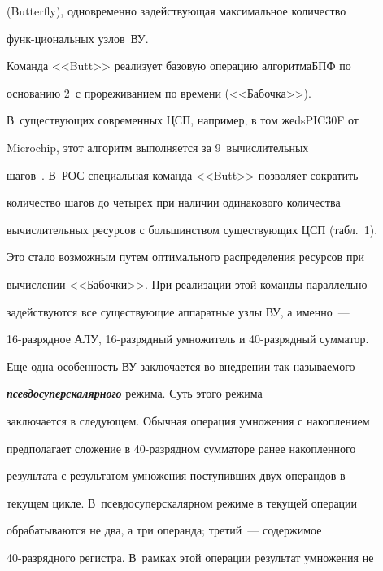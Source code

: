 (Butterfly), одновременно задействующая максимальное количество 


функ-\linebreak циональных узлов~ВУ.





      Команда <<Butt>> реализует базовую операцию алгоритма\linebreak БПФ по 


основанию 2~с прореживанием по времени (<<Бабочка>>). 


В~существующих современных ЦСП, например, в том же\linebreak dsPIC30F от 


Microchip, этот алгоритм выполняется за 9~вы\-чис\-ли\-тель\-ных 


шагов~\cite{5-2}. В~РОС специальная команда <<Butt>> позволяет сократить 


количество шагов до четырех при наличии одинакового количества 


вычислительных ресурсов с большинством существующих ЦСП (табл.~1). 


Это стало возможным путем оптимального распределения ресурсов при 


вычислении <<Бабочки>>. При реализации этой команды параллельно 


задействуются все существующие аппаратные узлы ВУ, а именно~--- \linebreak


16-раз\-ряд\-ное АЛУ, 16-раз\-ряд\-ный умножитель и 40-раз\-ряд\-ный сумматор.


      


      Еще одна особенность ВУ заключается во внедрении так называемого 


{\bfseries\textit{псевдосуперскалярного}} режима. Суть этого режима 


заключается в следующем. Обычная операция умножения с накоплением 


предполагает сложение в 40-раз\-ряд\-ном сумматоре ранее накопленного 


результата с результатом умножения поступивших двух операндов в 


текущем цикле. В~псевдосуперскалярном режиме в текущей операции 


обрабатываются не два, а три операнда; третий~--- содержимое 


40-раз\-ряд\-но\-го регистра. В~рамках этой операции результат умножения не 



